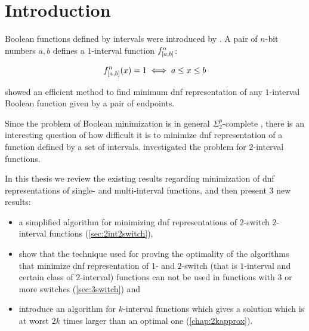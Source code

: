 \chapter*{Introduction}


Boolean functions defined by intervals were introduced
by \citet{Schieber2005154}.
A pair of $n$-bit numbers $a, b$
defines a $1$-interval function
$f^{n}_{[a, b]}$:

\[
f^{n}_{[a, b]} (x) = 1
\iff a \leq x \leq b
\]

\citeauthor{Schieber2005154} showed an efficient method
to find minimum \acrshort{dnf} representation
of any $1$-interval Boolean function
given by a pair of endpoints.

Since the problem of Boolean minimization is in general
$\Sigma_2^p$-complete \citep{Umans1998},
there is an interesting question of how difficult it is
to minimize \acrshort{dnf} representation of
a function defined by a set of intervals.
\citeauthor{Dubovsky2012} investigated the problem
for $2$-interval functions.

In this thesis we review the existing results regarding
minimization of \acrshort{dnf} representations of
single- and multi-interval functions,
and then present 3 new results:

\begin{itemize}
\item a simplified algorithm
for minimizing \acrshort{dnf} representations
of $2$-switch
$2$-interval functions (\autoref{sec:2int2switch}),
\item
show that the technique used for proving the optimality
of the algorithms that minimize
\acrshort{dnf} representation
of $1$- and $2$-switch
(that is $1$-interval and certain class of $2$-interval)
functions
can not be used in
functions with $3$ or more switches
(\autoref{sec:3switch}) and
\item
introduce an algorithm
for $k$-interval functions
which gives a solution which is at worst
$2k$ times larger than an optimal one
(\autoref{chap:2kapprox}).
\end{itemize}
